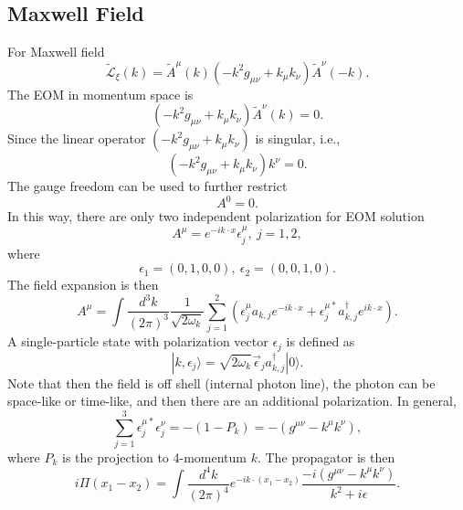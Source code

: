 \subsection{Maxwell Field}
For Maxwell field
\begin{equation}
	\tilde{\mathcal L}_{\xi}(k) = \tilde{A}^\mu(k)\left(-k^2 g_{\mu\nu}+k_\mu k_\nu\right) \tilde{A}^\nu(-k).
\end{equation}
The EOM in momentum space is
\begin{equation*}
	(-k^2 g_{\mu\nu}+k_\mu k_\nu) \tilde{A}^\nu(k) = 0.
\end{equation*}
Since the linear operator $(-k^2 g_{\mu\nu}+k_\mu k_\nu)$ is singular, i.e.,
\begin{equation*}
	(-k^2 g_{\mu\nu}+k_\mu k_\nu)k^\nu = 0.
\end{equation*}
The gauge freedom can be used to further restrict
\begin{equation*}
	A^0 = 0.
\end{equation*}
In this way, there are only two independent polarization for EOM solution
\begin{equation}
	A^\mu = e^{-ik\cdot x} \epsilon^\mu_j,\ j=1,2,
\end{equation}
where
\begin{equation*}
	\epsilon_1 = (0,1,0,0),\
	\epsilon_2 = (0,0,1,0).
\end{equation*}
The field expansion is then
\begin{equation}
	A^\mu = \int \frac{d^{3} k}{(2\pi)^{3}}\frac{1}{\sqrt{2\omega_k}}
	\sum_{j=1}^2 \left(\epsilon^\mu_j a_{k,j} e^{-ik\cdot x} + 
	\epsilon^{\mu*}_j a^\dagger_{k,j} e^{ik\cdot x}\right).
\end{equation}
A single-particle state with polarization vector $\epsilon_j$ is defined as
\begin{equation}
	|k,\epsilon_j\rangle = \sqrt{2\omega_k}	\vec\epsilon_j a^\dagger_{k,j}|0\rangle.
\end{equation}
Note that then the field is off shell (internal photon line), the photon can be space-like or time-like, and then there are an additional polarization.
In general, 
\begin{equation*}
	\sum_{j=1}^3 \epsilon^{\mu*}_j \epsilon^\nu_j = -(1 - P_{k}) = -(g^{\mu\nu}-k^\mu k^\nu),
\end{equation*}
where $P_k$ is the projection to 4-momentum $k$.
The propagator is then
\begin{equation}
	i\Pi(x_1-x_2)= \int \frac{d^4 k}{(2\pi)^4} e^{-ik\cdot(x_1-x_2)}\frac{-i(g^{\mu\nu}-k^\mu k^\nu)}{k^2+i\epsilon}.
\end{equation}



